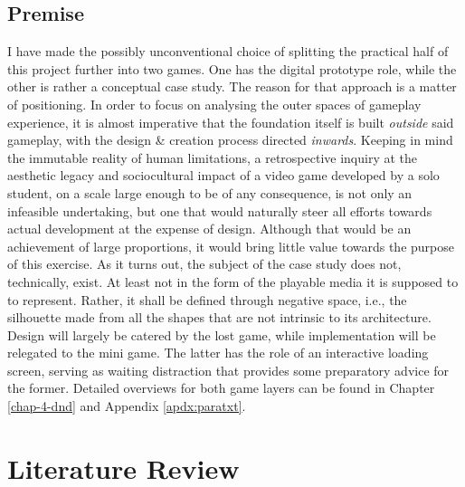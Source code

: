 \documentclass[12pt,oneside]{book}
\begin{document}
\section*{Premise}
I have made the possibly unconventional choice of splitting the practical half of this project further into two games.
One has the digital prototype role, while the other is rather a conceptual case study.
The reason for that approach is a matter of positioning.
In order to focus on analysing the outer spaces of gameplay experience, it is almost imperative that the foundation itself is built \textit{outside} said gameplay, with the design \& creation process directed \textit{inwards}.
Keeping in mind the immutable reality of human limitations, a retrospective inquiry at the aesthetic legacy and sociocultural impact of a video game developed by a solo student, on a scale large enough to be of any consequence, is not only an infeasible undertaking, but one that would naturally steer all efforts towards actual development at the expense of design.
Although that would be an achievement of large proportions, it would bring little value towards the purpose of this exercise.
As it turns out, the subject of the case study does not, technically, exist.
At least not in the form of the playable media it is supposed to to represent.
Rather, it shall be defined through negative space, i.e., the silhouette made from all the shapes that are not intrinsic to its architecture.
Design will largely be catered by the lost game, while implementation will be relegated to the mini game.
The latter has the role of an interactive loading screen, serving as waiting distraction that provides some preparatory advice for the former.
Detailed overviews for both game layers can be found in Chapter \ref{chap-4-dnd} and Appendix \ref{apdx:paratxt}.

\chapter{Literature Review}
\end{document}
